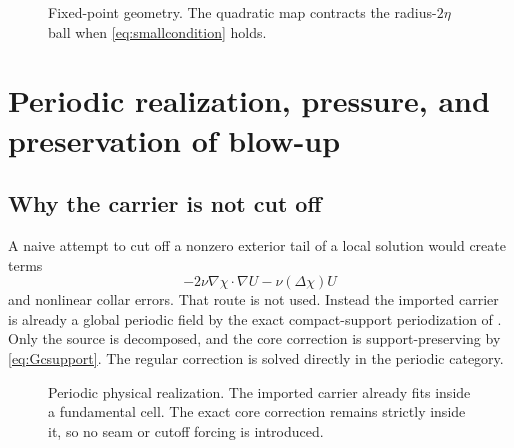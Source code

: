 \documentclass[11pt]{article}
\numberwithin{equation}{section}
\newcommand{\cB}{\mathcal B}
\begin{document}
\begin{figure}[ht]
\centering
{}
\caption{Fixed-point geometry.  The quadratic map contracts the radius-\(2\eta\) ball when \eqref{eq:smallcondition} holds.}
\label{fig:fixedpoint}
\end{figure}

\section{Periodic realization, pressure, and preservation of blow-up}\label{sec:periodic}

\subsection{Why the carrier is not cut off}
A naive attempt to cut off a nonzero exterior tail of a local solution would create terms
\begin{equation}
-2\nu\nabla\chi\cdot\nabla U-\nu(\Delta\chi)U
\label{eq:cutofferror}
\end{equation}
and nonlinear collar errors.  That route is not used.  Instead the imported carrier is already a global periodic field by the exact compact-support periodization of \cite[Cor.~10.6]{OpenAI2026NS}.  Only the source is decomposed, and the core correction is support-preserving by \eqref{eq:Gcsupport}.  The regular correction is solved directly in the periodic category.

\begin{figure}[ht]
\centering
{}
\caption{Periodic physical realization.  The imported carrier already fits inside a fundamental cell.  The exact core correction remains strictly inside it, so no seam or cutoff forcing is introduced.}
\label{fig:torus}
\end{figure}
\end{document}
